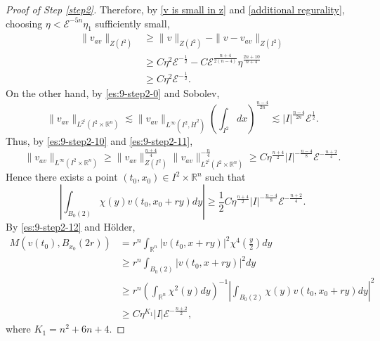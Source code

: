 \documentclass[11pt,a4paper]{article}
\numberwithin{equation}{section}
\begin{document}
\begin{proof}[Proof of Step \ref{step2}]
Therefore, by \eqref{v is small in z} and \eqref{additional regurality}, choosing $\eta < \mathcal{E}^{-5n}\eta_{1}$ sufficiently small,
\begin{equation}\label{es:9-step2-10}
\begin{aligned}
\|v_{av}\|_{Z(I^{2})}
&\geq \|v\|_{Z(I^{2})} - \|v-v_{av}\|_{Z(I^{2})} \\
&\geq C\eta^{2}\mathcal{E}^{-\frac{1}{2}} -  C\mathcal{E}^{\frac{n+4}{2(n-4)}}\eta^{\frac{2n + 10}{n + 4}} \\
&\geq C\eta^{2}\mathcal{E}^{-\frac{1}{2}}.
\end{aligned}
\end{equation}
On the other hand, by \eqref{es:9-step2-0} and Sobolev,
\begin{equation}\label{es:9-step2-11}
\|v_{av}\|_{L^{2^{\sharp}}(I^{2}\times \mathbb{R}^{n})} \lesssim \|v_{av}\|_{L^{\infty}(I^{2},\dot{H}^{2})}\left( \int_{I^{2}} dx \right)^{\frac{n-4}{2n}} \lesssim |I|^{\frac{n-4}{2n}}\mathcal{E}^{\frac{1}{2}}.
\end{equation}
Thus, by \eqref{es:9-step2-10} and \eqref{es:9-step2-11},
\[
\|v_{av}\|_{L^{\infty}(I^{2}\times \mathbb{R}^{n})}
\geq \|v_{av}\|_{Z(I^{2})}^{\frac{n+4}{4}}\|v_{av}\|_{L^{2^{\sharp}}(I^{2}\times \mathbb{R}^{n})}^{-\frac{n}{4}}
\geq
C\eta^{\frac{n+4}{2}}|I|^{-\frac{n-4}{8}}\mathcal{E}^{-\frac{n+2}{4}}.
\]
Hence there exists a point $(t_{0}, x_{0}) \in I^{2}\times \mathbb{R}^{n}$ such that
\begin{equation}\label{es:9-step2-12}
\left| \int_{B_{0}(2)} \chi(y) v(t_{0}, x_{0} + ry) dy \right| \geq \dfrac{1}{2}C\eta^{\frac{n+4}{2}}|I|^{-\frac{n-4}{8}}\mathcal{E}^{-\frac{n+2}{4}}.
\end{equation}
By \eqref{es:9-step2-12} and H\"older,
\begin{equation}\label{es:9-step2-13}
\begin{aligned}
M\left(v(t_{0}), B_{x_{0}}(2r)\right)
&= r^{n}\int_{\mathbb{R}^{n}}|v(t_{0}, x + ry)|^{2}\chi^{4}\left(\frac{y}{2}\right)dy \\
&\geq r^{n} \int_{B_{0}(2)} |v(t_{0}, x + ry)|^{2} dy \\
&\geq r^{n}\left( \int_{\mathbb{R}^{n}} \chi^{2}(y) dy\right)^{-1} \left| \int_{B_{0}(2)} \chi(y)v(t_{0}, x_{0} + ry) dy \right|^{2} \\
&\geq C\eta^{K_{1}}|I|\mathcal{E}^{-\frac{n+2}{2}},
\end{aligned}
\end{equation}
where $K_{1} = n^{2} + 6n + 4$.


\end{proof}
\end{document}
